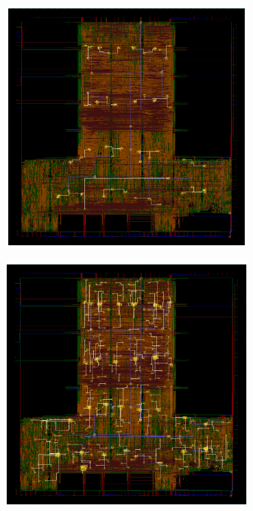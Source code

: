 \documentclass[compress]{beamer}
\begin{document}
\begin{frame}
	\begin{center}
		\includegraphics[width=0.7\textwidth]{clk4}
	\end{center}
\end{frame}
\begin{frame}
	\begin{center}
		\includegraphics[width=0.7\textwidth]{clk5}
	\end{center}
\end{frame}
\end{document}
